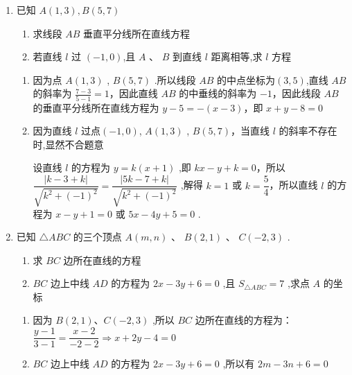 \begin{enumerate}
    \item 已知 $A\left( {1,3}\right) ,B\left( {5,7}\right)$
    \begin{enumerate}
        \item 求线段 ${AB}$ 垂直平分线所在直线方程
        \item 若直线 $l$ 过 $(-1,0)$,且 ${A}$ 、 $B$ 到直线 $l$ 距离相等,求 $l$ 方程
    \end{enumerate}
    \begin{jieda}
        \begin{enumerate}
            \item 因为点 $A\left( {1,3}\right)$ , $B\left( {5,7}\right)$ .所以线段 ${AB}$ 的中点坐标为$(3,5)$,直线 ${AB}$ 的斜率为 $\frac{7 - 3}{5 - 1} = 1$，因此直线 ${AB}$ 的中垂线的斜率为 $-1$，因此线段 ${AB}$ 的垂直平分线所在直线方程为 $y - 5 =  - \left( {x - 3}\right)$，即 $x + y - 8 = 0$
            \item 因为直线 $l$ 过点$(-1,0)$, $A\left( {1,3}\right)$ , $B\left( {5,7}\right)$，当直线 $l$ 的斜率不存在时,显然不合题意
            
            设直线 $l$ 的方程为 $y = k\left( {x + 1}\right)$ ,即 ${kx} - y + k = 0$，所以 $\dfrac{\left| k - 3 + k\right| }{\sqrt{{k}^{2} + {\left( -1\right) }^{2}}} = \dfrac{\left| 5k - 7 + k\right| }{\sqrt{{k}^{2} + {\left( -1\right) }^{2}}}$ ,解得 $k = 1$ 或 $k = \dfrac{5}{4}$，所以直线 $l$ 的方程为 $x - y + 1 = 0$ 或 ${5x} - {4y} + 5 = 0$ .
        \end{enumerate}
    \end{jieda}
    \item 已知 $\bigtriangleup  {ABC}$ 的三个顶点 $A\left( {m,n}\right)$ 、 $B\left( {2,1}\right)$ 、 $C\left( {-2,3}\right)$ .
    \begin{enumerate}
        \item 求 ${BC}$ 边所在直线的方程
        \item ${BC}$ 边上中线 ${AD}$ 的方程为 ${2x} - {3y} + 6 = 0$ ,且 ${S}_{\bigtriangleup {ABC}} = 7$ ,求点 $A$ 的坐标
    \end{enumerate}
    \begin{jieda}
        \begin{enumerate}
            \item 因为 $B\left( {2,1}\right) \text{、}C\left( {-2,3}\right)$ ,所以 ${BC}$ 边所在直线的方程为：$\dfrac{y - 1}{3 - 1} = \dfrac{x - 2}{-2 - 2} \Longrightarrow  x + {2y} - 4 = 0$
            
            \item ${BC}$ 边上中线 ${AD}$ 的方程为 ${2x} - {3y} + 6 = 0$ ,所以有 ${2m} - {3n} + 6 = 0$ 


\end{enumerate}
\end{jieda}
\end{enumerate}
